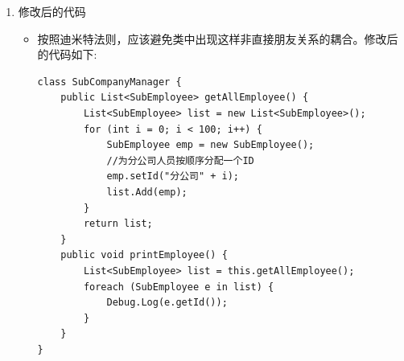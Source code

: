 \documentclass[9pt, b5paper]{article}
\begin{document}
\begin{enumerate}
\begin{itemize}
\begin{verbatim}
//分公司员工
class SubEmployee {
    private String id;
    public void setId(String id) {
        this.id = id;
    }
    public String getId() {
        return id;
    }
}

class SubCompanyManager {
    public List<SubEmployee> getAllEmployee() {
        List<SubEmployee> list = new List<SubEmployee>();
        for (int i = 0; i < 100; i++) {
            SubEmployee emp = new SubEmployee();
            //为分公司人员按顺序分配一个ID
            emp.setId("分公司" + i);
            list.Add(emp);
        }
        return list;
    }
}

class CompanyManager {
    public List<Employee> getAllEmployee() {
        List<Employee> list = new List<Employee>();
        for (int i = 0; i < 30; i++) {
            Employee emp = new Employee();
            //为总公司人员按顺序分配一个ID
            emp.setId("总公司" + i);
            list.Add(emp);
        }
        return list;
    }
    public void printAllEmployee(SubCompanyManager sub) {
        List<SubEmployee> list1 = sub.getAllEmployee();
        foreach (SubEmployee e in list1) {
            Debug.Log(e.getId());
        }
        List<Employee> list2 = this.getAllEmployee();
        foreach (Employee e in list2) {
            Debug.Log(e.getId());
        }
    }
}

public class Client {
    void Start() {
        CompanyManager e = new CompanyManager();
        e.printAllEmployee(new SubCompanyManager());
    }
}
\end{verbatim}
\item 现在这个设计的主要问题出在CompanyManager中，根据迪米特法则，只与直接的朋友发生通信，
\item 而SubEmployee类并不是CompanyManager类的直接朋友（以局部变量出现的耦合不属于直接朋友），从逻辑上讲总公司只与他的分公司耦合就行了，
\item 与分公司的员工并没有任何联系，这样设计显然是增加了不必要的耦合。
\end{itemize}
\item 修改后的代码
\label{sec:org5ac68bc}
\begin{itemize}
\item 按照迪米特法则，应该避免类中出现这样非直接朋友关系的耦合。修改后的代码如下:
\begin{verbatim}
class SubCompanyManager {
    public List<SubEmployee> getAllEmployee() {
        List<SubEmployee> list = new List<SubEmployee>();
        for (int i = 0; i < 100; i++) {
            SubEmployee emp = new SubEmployee();
            //为分公司人员按顺序分配一个ID
            emp.setId("分公司" + i);
            list.Add(emp);
        }
        return list;
    }
    public void printEmployee() {
        List<SubEmployee> list = this.getAllEmployee();
        foreach (SubEmployee e in list) {
            Debug.Log(e.getId());
        }
    }
}


\end{verbatim}
\end{itemize}
\end{enumerate}
\end{document}
